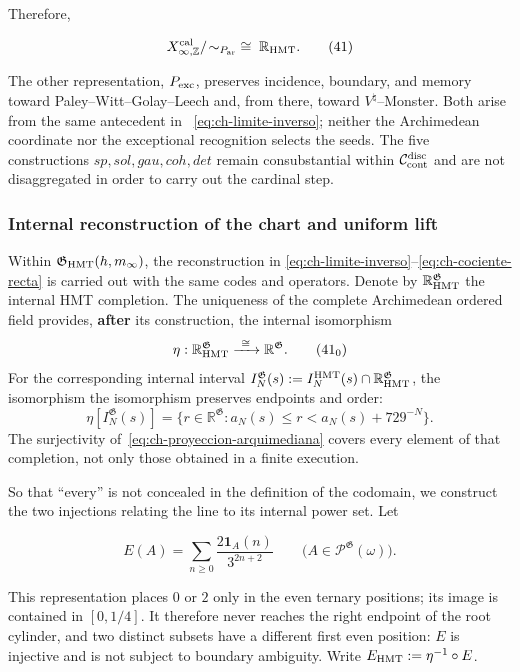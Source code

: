 Therefore,

\[
 X_{\infty,\mathbb Z}^{\rm cal}/\!\sim_{P_{\rm ar}}
 \;\cong\;\mathbb R_{\rm HMT}.
\tag{41}\label{eq:ch-cociente-recta}
\]

The other representation, \(P_{\rm exc}\), preserves incidence, boundary, and
memory toward Paley--Witt--Golay--Leech and, from there, toward
\(V^\natural\)--Monster. Both arise from the same antecedent in
~\eqref{eq:ch-limite-inverso}; neither the Archimedean coordinate nor the
exceptional recognition selects the seeds. The five constructions
\(sp,sol,gau,coh,det\) remain consubstantial within
\(\mathcal C_{\rm cont}^{\rm disc}\) and are not disaggregated in order to
carry out the cardinal step.



\subsubsection{Internal reconstruction of the chart and uniform lift}

Within \(\mathfrak G_{\rm HMT}(h,m_\infty)\), the reconstruction in
\eqref{eq:ch-limite-inverso}--\eqref{eq:ch-cociente-recta} is carried out with
the same codes and operators. Denote by
\(\mathbb R_{\rm HMT}^{\mathfrak G}\) the internal HMT completion. The
uniqueness of the complete Archimedean ordered field provides, \textbf{after}
its construction, the internal isomorphism
\[
 \eta:\mathbb R_{\rm HMT}^{\mathfrak G}
 \xrightarrow{\ \cong\ }\mathbb R^{\mathfrak G}.
\tag{41$_0$}\label{eq:ch-isomorfismo-interno}
\]
For the corresponding internal interval
\(I_N^{\mathfrak G}(s):=
 I_N^{\rm HMT}(s)\cap\mathbb R_{\rm HMT}^{\mathfrak G}\), the isomorphism
the isomorphism preserves endpoints and order:
\[
 \eta[I_N^{\mathfrak G}(s)]
 =\{r\in\mathbb R^{\mathfrak G}:
      a_N(s)\le r<a_N(s)+729^{-N}\}.
\tag{41$_0$a}\label{eq:ch-intervalos-internos}
\]
The surjectivity of~\eqref{eq:ch-proyeccion-arquimediana} covers every element
of that completion, not only those obtained in a finite execution.

So that “every” is not concealed in the definition of the codomain, we
construct the two injections relating the line to its internal power set. Let

\[
 E(A)=\sum_{n\ge0}\frac{2\mathbf1_A(n)}{3^{2n+2}}
 \qquad
 \bigl(A\in\mathcal P^{\mathfrak G}(\omega)\bigr).
\tag{41a}\label{eq:ch-incrustacion-cantor}
\]

This representation places \(0\) or \(2\) only in the even ternary positions;
its image is contained in \([0,1/4]\). It therefore never reaches the right
endpoint of the root cylinder, and two distinct subsets have a different first
even position: \(E\) is injective and is not subject to boundary ambiguity.
Write \(E_{\rm HMT}:=\eta^{-1}\circ E\).

